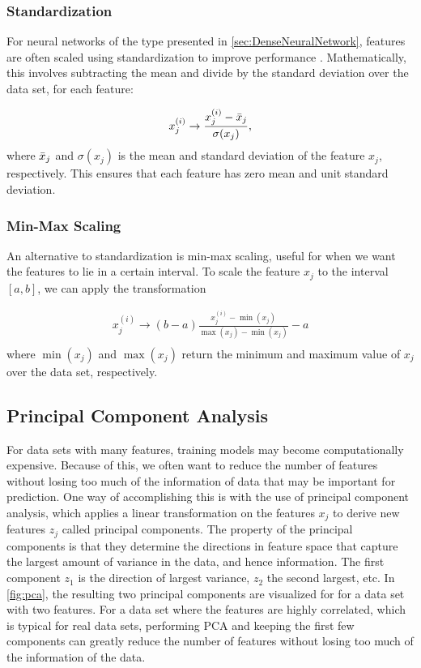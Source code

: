 \subsubsection*{Standardization}
For neural networks of the type presented in \cref{sec:DenseNeuralNetwork}, features are often scaled using standardization to improve performance \cite{LeCun2012}. Mathematically, this involves subtracting the mean and divide by the standard deviation over the data set, for each feature:

\begin{equation}
    x_j^{(i)} \rightarrow \frac{x_j^{(i)} - \Bar{x}_j}{\sigma(x_j)},
\end{equation}
where $\Bar{x}_j$ and $\sigma(x_j)$ is the mean and standard deviation of the feature $x_j$, respectively. This ensures that each feature has zero mean and unit standard deviation.

\subsubsection*{Min-Max Scaling}
An alternative to standardization is min-max scaling, useful for when we want the features to lie in a certain interval. To scale the feature $x_j$ to the interval $[a, b]$, we can apply the transformation

\begin{equation}
\begin{aligned}
    x_j^{(i)} \rightarrow (b-a)\frac{x_j^{(i)} - \min(x_j)}{\max(x_j) - \min(x_j)} - a\\
\end{aligned}  
\end{equation}
where $\min(x_j)$ and $\max(x_j)$ return the minimum and maximum value of $x_j$ over the data set, respectively.

\subsection{Principal Component Analysis}\label{sec:Principal Component Analysis}
For data sets with many features, training models may become computationally expensive. Because of this, we often want to reduce the number of features without losing too much of the information of data that may be important for prediction. One way of accomplishing this is with the use of principal component analysis, which applies a linear transformation on the features $x_j$ to derive new features $z_j$ called principal components. The property of the principal components is that they determine the directions in feature space that capture the largest amount of variance in the data, and hence information. The first component $z_1$ is the direction of largest variance, $z_2$ the second largest, etc. In \cref{fig:pca}, the resulting two principal components are visualized for for a data set with two features. For a data set where the features are highly correlated, which is typical for real data sets, performing PCA and keeping the first few components can greatly reduce the number of features without losing too much of the information of the data.

